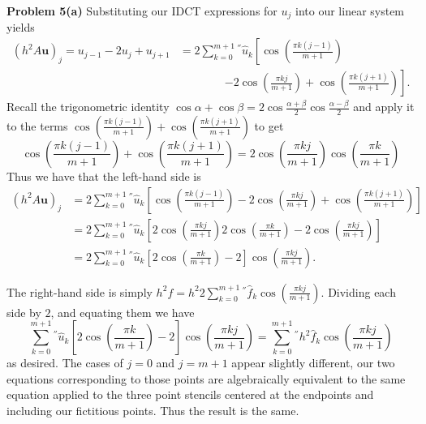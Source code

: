 \documentclass[12pt]{article}
\newcommand{\problem}[1]{\hspace{-4 ex} \large \textbf{Problem #1} }
\renewcommand{\vec}[1]{\boldsymbol{\mathbf{#1}}}
\begin{document}
\bigbreak
\problem{5(a)} Substituting our IDCT expressions for $u_j$ into our linear system yields
\begin{align*}
	\left(h^2A\vec{u} \right)_j = u_{j-1} -2u_j + u_{j+1} &= 2 \sum\limits_{k=0}^{m+1}{}^{''} \hat{u}_k \left[  \cos\left( \frac{\pi k (j-1)}{m+1} \right) \right. \\
	&\phantom{===}\left. - 2 \cos\left( \frac{\pi k j}{m+1} \right) + \cos\left( \frac{\pi k (j+1)}{m+1} \right) \right].
\end{align*}
Recall the trigonometric identity $\cos \alpha + \cos \beta = 2 \cos\frac{\alpha +\beta}{2}\cos\frac{\alpha -\beta}{2}$ and apply it to the terms $\cos\left( \frac{\pi k (j-1)}{m+1} \right) + \cos\left( \frac{\pi k (j+1)}{m+1} \right)$ to get 
$$
\cos\left( \frac{\pi k (j-1)}{m+1} \right) + \cos\left( \frac{\pi k (j+1)}{m+1} \right) = 2\cos\left( \frac{\pi k j}{m+1} \right)\cos\left( \frac{\pi k}{m+1} \right)
$$
Thus we have that the left-hand side is 
\begin{align*}
	\left(h^2A\vec{u} \right)_j & = 2  \sum\limits_{k=0}^{m+1}{}^{''} \hat{u}_k \left[  \cos\left( \frac{\pi k (j-1)}{m+1} \right) - 2 \cos\left( \frac{\pi k j}{m+1} \right) + \cos\left( \frac{\pi k (j+1)}{m+1} \right) \right] \\
	&= 2  \sum\limits_{k=0}^{m+1}{}^{''} \hat{u}_k \left[  2\cos\left( \frac{\pi k j}{m+1} \right) 2\cos\left( \frac{\pi k}{m+1} \right) - 2 \cos\left( \frac{\pi k j}{m+1} \right)  \right] \\
	&= 2  \sum\limits_{k=0}^{m+1}{}^{''} \hat{u}_k \left[  2\cos\left( \frac{\pi k}{m+1} \right) - 2 \right] \cos\left( \frac{\pi k j}{m+1} \right) .
\end{align*}

The right-hand side is simply $h^2f = h^2 2 \sum\limits_{k=0}^{m+1}{}^{''} \hat{f}_k\cos\left( \frac{\pi k j}{m+1} \right)$. Dividing each side by $2$, and equating them we have
$$
\sum\limits_{k=0}^{m+1}{}^{''} \hat{u}_k \left[  2\cos\left( \frac{\pi k}{m+1} \right) - 2 \right] \cos\left( \frac{\pi k j}{m+1} \right) =  \sum\limits_{k=0}^{m+1}{}^{''} h^2\hat{f}_k\cos\left( \frac{\pi k j}{m+1} \right)
$$
as desired. The cases of $j=0$ and $j= m+1$ appear slightly different, our two equations corresponding to those points are algebraically equivalent to the same equation applied to the three point stencils centered at the endpoints and including our fictitious points. Thus the result is the same.
\end{document}
